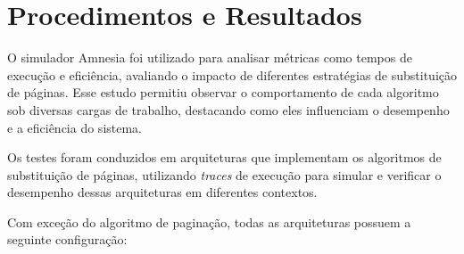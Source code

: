 \documentclass[
	12pt,				%
	oneside,   	        %
	a4paper,			%
	english,			%
	french,				%
	spanish,			%
	brazil,				%
	]{pacotes/abntex2}
\begin{document}
\section{Procedimentos e Resultados}
\label{sec:procedimentos}
O simulador Amnesia foi utilizado para analisar métricas como tempos de execução e eficiência, avaliando o impacto de diferentes estratégias de substituição de páginas. Esse estudo permitiu observar o comportamento de cada algoritmo sob diversas cargas de trabalho, destacando como eles influenciam o desempenho e a eficiência do sistema.

Os testes foram conduzidos em arquiteturas que implementam os algoritmos de substituição de páginas, utilizando \textit{traces} de execução para simular e verificar o desempenho dessas arquiteturas em diferentes contextos.

Com exceção do algoritmo de paginação, todas as arquiteturas possuem a seguinte configuração:
\end{document}
